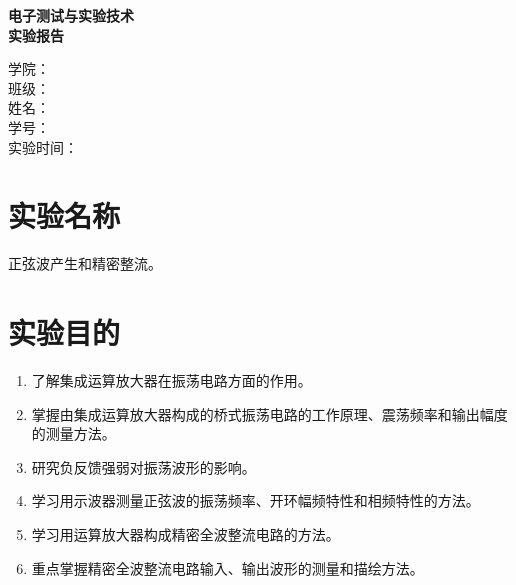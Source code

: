 \documentclass[a4paper,12pt]{article}
\begin{document}
\begin{titlepage}
    \centering
    \vfill
    {\bfseries 电子测试与实验技术\\[0.6em]实验报告\par}
    \vfill
    \vfill

    \begin{minipage}{0.72\textwidth}
        学\quad\quad 院：\underline{}\\[1.6em]
        班\quad\quad 级：\underline{}\\[1.6em]
        姓\quad\quad 名：\underline{}\\[1.6em]
        学\quad\quad 号：\underline{}\\[1.6em]
        实验时间：\underline{}
    \end{minipage}

    \vfill
    \vfill
\end{titlepage}

\setcounter{page}{1}



\section{实验名称}
正弦波产生和精密整流。

\section{实验目的}
\begin{enumerate}
    \item 了解集成运算放大器在振荡电路方面的作用。
    \item 掌握由集成运算放大器构成的桥式振荡电路的工作原理、震荡频率和输出幅度的测量方法。
    \item 研究负反馈强弱对振荡波形的影响。
    \item 学习用示波器测量正弦波的振荡频率、开环幅频特性和相频特性的方法。
    \item 学习用运算放大器构成精密全波整流电路的方法。
    \item 重点掌握精密全波整流电路输入、输出波形的测量和描绘方法。
\end{enumerate}
\end{document}
